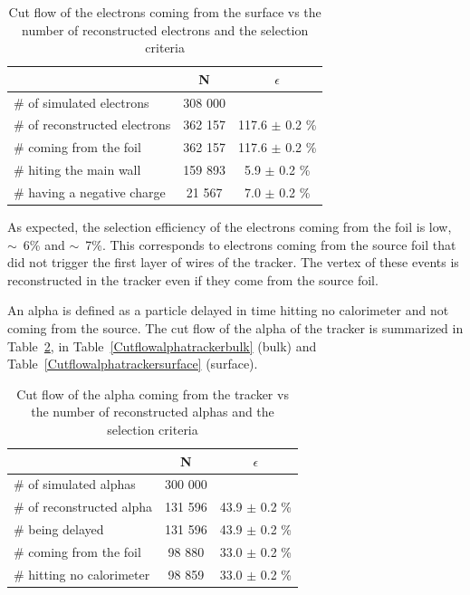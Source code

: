 \documentclass[main.tex]{subfiles}
\begin{document}
\begin{table}[h!]
\begin{center}
\begin{tabular}{l|c|c}
 & N & $\epsilon$ \\
\toprule
$\#$ of simulated electrons & 308 000 & \\
\hline
$\#$ of reconstructed electrons & 362 157 & 117.6 $\pm$ 0.2 \% \\
$\#$ coming from the foil       & 362 157 & 117.6 $\pm$ 0.2 \%\\
$\#$ hiting the main wall       & 159 893 & 5.9 $\pm$ 0.2 \%\\
$\#$ having a negative charge   & 21 567  & 7.0 $\pm$ 0.2 \%\\
\bottomrule
\end{tabular}
\end{center}
\caption{Cut flow of the electrons coming from the surface vs the number of reconstructed electrons and the selection criteria}
\label{Cutflowelectrontrackersurface}
\end{table}


\bigskip

\noindent As expected, the selection efficiency of the electrons coming from the foil is low, $\sim$~6\% and $\sim$~7\%. This corresponds to electrons coming from the source foil that did not trigger the first layer of wires of the tracker. The vertex of these events is reconstructed in the tracker even if they come from the source foil.  


\bigskip


\noindent An alpha is defined as a particle delayed in time hitting no calorimeter and not coming from the source. The cut flow of the alpha of the tracker is summarized in Table~\ref{Cutflowalphatrackertracker}, in Table~\ref{Cutflowalphatrackerbulk} (bulk) and Table~\ref{Cutflowalphatrackersurface} (surface).


\begin{table}[h!]
\begin{center}
\begin{tabular}{l|c|c}
 & N & $\epsilon$ \\
\toprule
$\#$ of simulated alphas & 300 000 & \\
\hline
$\#$ of reconstructed alpha & 131 596 & 43.9 $\pm$ 0.2 \%\\
$\#$ being delayed          & 131 596 & 43.9 $\pm$ 0.2 \%\\
$\#$ coming from the foil   & 98 880  & 33.0 $\pm$ 0.2 \%\\
$\#$ hitting no calorimeter & 98 859  & 33.0 $\pm$ 0.2 \%\\
\bottomrule
\end{tabular}
\end{center}
\caption{Cut flow of the alpha coming from the tracker vs the number of reconstructed alphas and the selection criteria}
\label{Cutflowalphatrackertracker}
\end{table}
\end{document}
